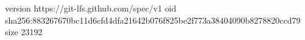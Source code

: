 version https://git-lfs.github.com/spec/v1
oid sha256:883267670bc11d6cfd4dfa21642b076f825be2f773a38404090b8278820ccd79
size 23192
